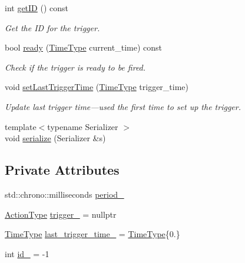\begin{DoxyCompactItemize}
int \hyperlink{structvt_1_1timetrigger_1_1_trigger_add9337af4c0c64a4d9903555d2d74835}{get\+ID} () const
\begin{DoxyCompactList}\small\item\em Get the ID for the trigger. \end{DoxyCompactList}\item 
bool \hyperlink{structvt_1_1timetrigger_1_1_trigger_af00027850254b42fbcc2f5fde829b386}{ready} (\hyperlink{namespacevt_a2b9f28078dc309ad0706b69ded743e69}{Time\+Type} current\+\_\+time) const
\begin{DoxyCompactList}\small\item\em Check if the trigger is ready to be fired. \end{DoxyCompactList}\item 
void \hyperlink{structvt_1_1timetrigger_1_1_trigger_aae694885195a12a0bd7274859bfaa0ba}{set\+Last\+Trigger\+Time} (\hyperlink{namespacevt_a2b9f28078dc309ad0706b69ded743e69}{Time\+Type} trigger\+\_\+time)
\begin{DoxyCompactList}\small\item\em Update last trigger time---used the first time to set up the trigger. \end{DoxyCompactList}\item 
{\footnotesize template$<$typename Serializer $>$ }\\void \hyperlink{structvt_1_1timetrigger_1_1_trigger_ab765fcb8e674543c4f1dd22aa97fdf6e}{serialize} (Serializer \&s)
\end{DoxyCompactItemize}
\subsection*{Private Attributes}
\begin{DoxyCompactItemize}
\item 
std\+::chrono\+::milliseconds \hyperlink{structvt_1_1timetrigger_1_1_trigger_aa95009a5d9a17ffdb84b5317a7a5dfc2}{period\+\_\+}
\item 
\hyperlink{namespacevt_ae0a5a7b18cc99d7b732cb4d44f46b0f3}{Action\+Type} \hyperlink{structvt_1_1timetrigger_1_1_trigger_ac1d93e6fff9b0faa8889198e481d50d4}{trigger\+\_\+} = nullptr
\item 
\hyperlink{namespacevt_a2b9f28078dc309ad0706b69ded743e69}{Time\+Type} \hyperlink{structvt_1_1timetrigger_1_1_trigger_ac844f5940943ca203c90dd485d47a0c6}{last\+\_\+trigger\+\_\+time\+\_\+} = \hyperlink{namespacevt_a2b9f28078dc309ad0706b69ded743e69}{Time\+Type}\{0.\}
\item 
int \hyperlink{structvt_1_1timetrigger_1_1_trigger_a1a640c2311fa49ed0a7b79480dda4439}{id\+\_\+} = -\/1
\end{DoxyCompactItemize}
